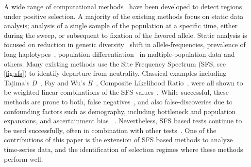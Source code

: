 A wide range of computational methods~\cite{vitti2013detecting} have
been developed to detect regions under positive selection. A majority
of the existing methods focus on static data analysis; analysis of a
single sample of the population at a specific time, either during the
sweep, or subsequent to fixation of the favored allele. Static
analysis is focused on reduction in genetic
diversity~\cite{tajima1989statistical,fay2000hitchhiking,ronen2013learning,garud2015recent}
shift in allele-frequencies, prevalence of long
haplotypes~\cite{sabeti2006positive,vitti2013detecting}, population
differentiation~\cite{holsinger2009genetics,burke2010genome,gunther2013robust} 
in
multiple-population data and others. Many existing methods use the
Site Frequency Spectrum (SFS, see \ref{fig:sfs}) to
identify departure from neutrality. Classical examples including
Tajima's \emph{D}~\cite{tajima1989statistical}, Fay and Wu's
\emph{H}~\cite{fay2000hitchhiking}, Composite Likelihood
Ratio~\cite{nielsen2005genomic}, were all shown to be weighted linear
combinations of the SFS values~\cite{achaz2009frequency}.  While
successful, these methods are prone to both, false
negatives~\cite{messer2013population}, and also false-discoveries due
to confounding factors such as demography, including bottleneck and
population expansions, and ascertainment bias ~\cite{ptak2002evidence,
  ramos2002statistical,akey2009constructing,
  nielsen2003correcting,messer2013population}. Nevertheless, SFS based
tests continue to be used successfully, often in combination with
other tests~\cite{akey2009constructing,vitti2013detecting}. One of the
contributions of this paper is the extension of SFS based methods to
analyze time-series data, and the identification of selection regimes
where these methods perform well.


